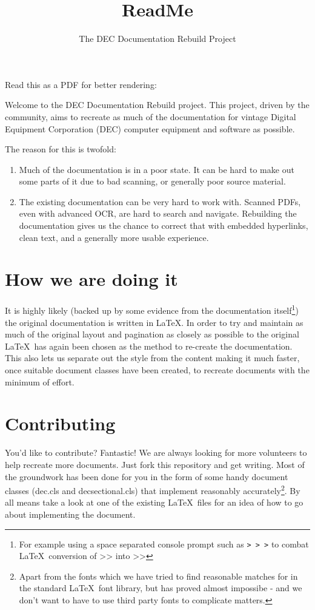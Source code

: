 \documentclass{decsectional}
\title{ReadMe}
\author{The DEC Documentation Rebuild Project}
\begin{document}
Read this as a PDF for better rendering: 

\toc
\newpage

\pagestyle{preface}

Welcome to the DEC Documentation Rebuild project.  This project, driven by the community, aims to
recreate as much of the documentation for vintage Digital Equipment Corporation (DEC) computer 
equipment and software as possible.

The reason for this is twofold:

\begin{enumerate}

\item 	Much of the documentation is in a poor state. It can be hard to make out some parts of it due to bad scanning,
		or generally poor source material.

\item	The existing documentation can be very hard to work with. Scanned PDFs, even with advanced OCR, are hard to
		search and navigate. Rebuilding the documentation gives us the chance to correct that with embedded hyperlinks,
		clean text, and a generally more usable experience.

\end{enumerate}

\chapter{How we are doing it}
\pagestyle{main}

It is highly likely (backed up by some evidence from the documentation itself\footnote{For example using a space separated console prompt such as {\tt > > >}
to combat \LaTeX\ conversion of {>}{>} into >> }) the original documentation is written in \LaTeX. In order to try and maintain as much of the original layout and pagination as closely
as possible to the original \LaTeX\ has again been chosen as the method to re-create the documentation. This also lets us separate out the style from the content
making it much faster, once suitable document classes have been created, to recreate documents with the minimum of effort.

\chapter{Contributing}

You'd like to contribute? Fantastic! We are always looking for more volunteers to help recreate more documents. Just fork this repository and get
writing. Most of the groundwork has been done for you in the form of some handy document classes (dec.cls and decsectional.cls) that implement
reasonably accurately\footnote{Apart from the fonts which we have tried to find reasonable matches for in the standard \LaTeX\ font library, but
has proved almost impossibe - and we don't want to have to use third party fonts to complicate matters.}. By all means take a look at one of the
existing \LaTeX\ files for an idea of how to go about implementing the document.
\end{document}
